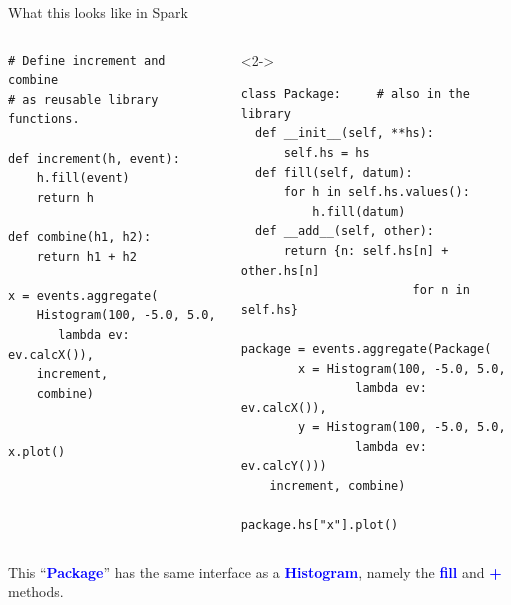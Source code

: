 \documentclass[aspectratio=169]{beamer}
\begin{document}
\begin{frame}[fragile]{What this looks like in Spark}
\begin{columns}
\small
\begin{verbatim}
# Define increment and combine
# as reusable library functions.

def increment(h, event):
    h.fill(event)
    return h

def combine(h1, h2):
    return h1 + h2

x = events.aggregate(
    Histogram(100, -5.0, 5.0,
       lambda ev: ev.calcX()),
    increment,
    combine)


x.plot()
\end{verbatim}

\begin{uncoverenv}<2->
\small
\begin{verbatim}
class Package:     # also in the library
  def __init__(self, **hs):
      self.hs = hs
  def fill(self, datum):
      for h in self.hs.values():
          h.fill(datum)
  def __add__(self, other):
      return {n: self.hs[n] + other.hs[n]
                        for n in self.hs}

package = events.aggregate(Package(
        x = Histogram(100, -5.0, 5.0,
                lambda ev: ev.calcX()),
        y = Histogram(100, -5.0, 5.0,
                lambda ev: ev.calcY()))
    increment, combine)

package.hs["x"].plot()
\end{verbatim}
\end{uncoverenv}
\end{columns}
\end{frame}

\begin{frame}{}
\begin{center}
\Large This ``\textcolor{blue}{\ttfamily \textbf{Package}}'' has the same interface as a \textcolor{blue}{\ttfamily \textbf{Histogram}}, namely the \textcolor{blue}{\ttfamily \textbf{fill}} and \textcolor{blue}{\ttfamily \textbf{+}} methods.
\end{center}
\end{frame}
\end{document}
